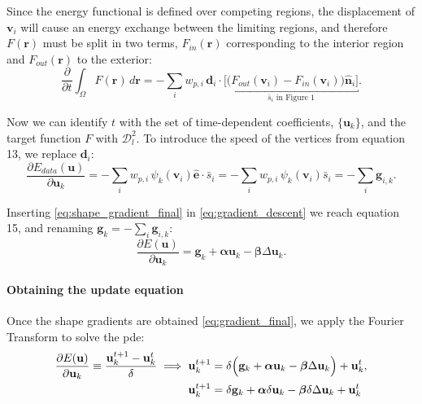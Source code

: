 \documentclass[a4paper]{report}
\renewcommand{\vec}[1]{\mathbf{#1}}
\begin{document}
Since the energy functional is defined over competing regions, the displacement of $\vec{v}_i$ will cause
  an energy exchange between the limiting regions, and therefore $F(\vec{r})$ must be split in
  two terms, $F_{in}(\vec{r})$ corresponding to the interior region and $F_{out}(\vec{r})$ to the exterior:
  \begin{equation}
  \frac{\partial}{\partial t} \int_\Omega F(\vec{r}) \, d\vec{r} =
  - \underset{i}{\sum} w_{p,i} \, \vec{d}_i \cdot
  \underbracket{\Big[ \big(F_{out}(\vec{v}_i) - F_{in}(\vec{v}_i) \big) \hat{\vec{n}}_i \Big]}_{\bar{s}_i \text{ in Figure 1}}.
  \label{eq:shape_gradient_disc2}
  \end{equation}

Now we can identify $t$ with the set of time-dependent coefficients, $\{\vec{u}_k\}$, and the target function $F$ with $\mathcal{D}_l^2$.
To introduce the speed of the vertices from equation 13, we replace $\vec{d}_i$:
\begin{equation}
  \frac{\partial E_{data}(\vec{u})}{\partial \vec{u}_k} =
  - \underset{i}{\sum} w_{p,i} \, \psi_k(\vec{v}_i) \hat{\vec{e}} \cdot \bar{s}_i =
  - \underset{i}{\sum} w_{p,i} \, \psi_k(\vec{v}_i) \bar{s}_i = - \underset{i}{\sum} \vec{g}_{i,k}.
  \label{eq:shape_gradient_final}
\end{equation}

Inserting \eqref{eq:shape_gradient_final} in \eqref{eq:gradient_descent} we reach equation 15,
  and renaming $\vec{g}_k = - \underset{i}{\sum} \vec{g}_{i,k}$:
  \begin{equation}
  \frac{\partial E(\vec{u})}{\partial \vec{u}_k} =
  \vec{g}_k + \boldsymbol{\alpha} \vec{u}_k
  -\boldsymbol{\beta} \Delta \vec{u}_k.
  \label{eq:gradient_final}
  \end{equation}


\paragraph{Obtaining the update equation} Once the shape gradients are obtained \eqref{eq:gradient_final},
  we apply the Fourier Transform to solve the \gls*{pde}:
\begin{align}
  \frac{\partial E(\vec{u})}{\partial \vec{u}_k} \equiv \frac{\vec{u}_k^{t+1} - \vec{u}_k^t}{\delta} \implies
  \vec{u}_k^{t+1} &= \delta \Big( \vec{g}_k + \boldsymbol{\alpha} \vec{u}_k
  - \boldsymbol{\beta} \Delta \vec{u}_k \Big) + \vec{u}_k^t, \notag \\
  \vec{u}_k^{t+1} &= \delta \vec{g}_k +  \boldsymbol{\alpha} \delta \vec{u}_k
  - \boldsymbol{\beta} \delta \Delta \vec{u}_k + \vec{u}_k^t
  \label{eq:discrete_derivative}
\end{align}
\end{document}
